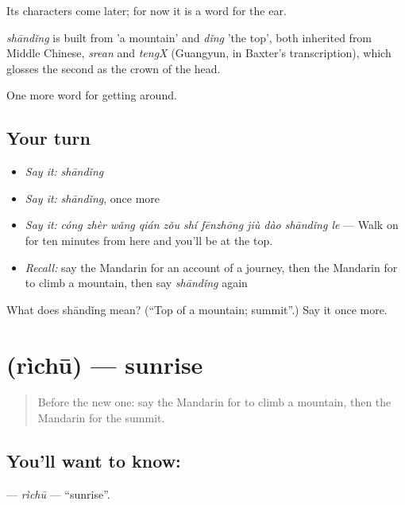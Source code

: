 Its characters come later; for now it is a word for the ear.

\begin{cousinweb}
\emph{shāndǐng} is built from  'a mountain' and \emph{dǐng} 'the top', both inherited from Middle Chinese, \emph{srean} and \emph{tengX} (Guangyun, in Baxter's transcription), which glosses the second as the crown of the head.
\end{cousinweb}

\begin{grammarlens}[title={What you've built}]
One more word for getting around.
\end{grammarlens}

\subsection*{Your turn}
\begin{itemize}
\raggedright
  \item \emph{Say it:} \emph{shāndǐng}
  \item \emph{Say it:} \emph{shāndǐng}, once more
  \item \emph{Say it:} \emph{cóng zhèr wǎng qián zǒu shí fēnzhōng jiù dào shāndǐng le} — Walk on for ten minutes from here and you'll be at the top.
  \item \emph{Recall:} say the Mandarin for an account of a journey, then the Mandarin for to climb a mountain, then say \emph{shāndǐng} again
\end{itemize}

\begin{tcolorbox}[breakable,colback=teal!4,colframe=teal!35!black,title={Before you move on}]
What does shāndǐng mean? (\textquotedblleft{}Top of a mountain; summit\textquotedblright{}.) Say it once more.
\end{tcolorbox}
\section[\texorpdfstring{\zh{日出} (rìchū)}{日出 (rìchū)}]{ (rìchū) — sunrise}

\label{lesson:ZH-C435-richu}



\begin{quote}
Before the new one: say the Mandarin for to climb a mountain, then the Mandarin for the summit.
\end{quote}

\subsection*{You'll want to know: }
\textbf{} — \emph{rìchū} — \textquotedblleft{}sunrise\textquotedblright{}.

